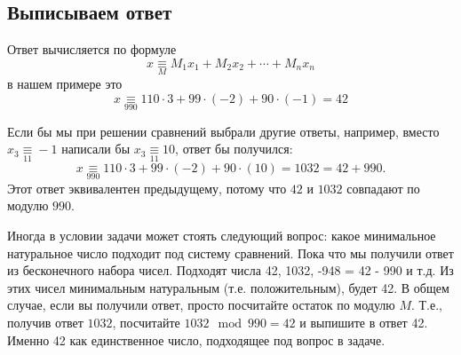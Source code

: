 \documentclass{article}
\newcommand{\eqmod}[1]{\mathbin{\underset{#1}\equiv}}
\begin{document}
\subsection{Выписываем ответ}

Ответ вычисляется по формуле
\[
x\eqmod{M}M_1x_1 + M_2x_2 + \cdots + M_nx_n
\]
в нашем примере это
\[
x\eqmod{990}110\cdot3+99\cdot(-2) + 90\cdot(-1)=42
\]

Если бы мы при решении сравнений выбрали другие ответы, например, вместо $x_3 \eqmod{11} -1$ написали бы
$x_3 \eqmod{11} 10$, ответ бы получился:
\[
x\eqmod{990}110\cdot3+99\cdot(-2) + 90\cdot(10) = 1032 = 42 + 990.
\]
Этот ответ эквивалентен предыдущему, потому что $42$ и $1032$ совпадают по модулю $990$.

Иногда в условии задачи может стоять следующий вопрос: какое минимальное натуральное число подходит под систему
сравнений. Пока что мы получили ответ из бесконечного набора чисел. Подходят числа 42, 1032, -948 = 42 - 990 и т.д.
Из этих чисел минимальным натуральным (т.е. положительным), будет 42. В общем случае, если вы получили ответ, просто
посчитайте остаток по модулю $M$. Т.е., получив ответ $1032$, посчитайте $1032 \mod 990 = 42$ и выпишите в ответ 42.
Именно 42 как единственное число, подходящее под вопрос в задаче.
\end{document}
